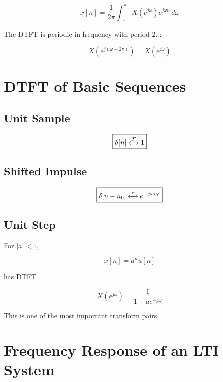 \[
\boxed{
x[n]=
\frac{1}{2\pi}
\int_{-\pi}^{\pi}
X(e^{j\omega})e^{j\omega n}\,d\omega
}
\]

The DTFT is periodic in frequency with period \(2\pi\):

\[
\boxed{
X(e^{j(\omega+2\pi)})=X(e^{j\omega})
}
\]


\section{DTFT of Basic Sequences}


\subsection{Unit Sample}

\[
\boxed{
\delta[n]\xleftrightarrow{\mathcal{F}}1
}
\]


\subsection{Shifted Impulse}

\[
\boxed{
\delta[n-n_0]
\xleftrightarrow{\mathcal{F}}
e^{-j\omega n_0}
}
\]


\subsection{Unit Step}

For \(|a|<1\),

\[
x[n]=a^n u[n]
\]

has DTFT

\[
\boxed{
X(e^{j\omega})=
\frac{1}{1-ae^{-j\omega}}
}
\]

This is one of the most important transform pairs.


\section{Frequency Response of an LTI System}

